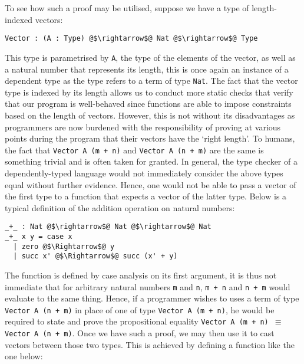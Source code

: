 \documentclass[12pt,twoside,maitrise]{dms}
\theoremstyle{definition}
\numberwithin{equation}{section}
\numberwithin{table}{chapter}
\numberwithin{figure}{chapter}
\newcommand\fn[1] {\texttt{#1}}
\begin{document}

To see how such a proof may be utilised, suppose we have a type of
length-indexed vectors:

\begin{verbatim}
Vector : (A : Type) @$\rightarrow$@ Nat @$\rightarrow$@ Type
\end{verbatim}

This type is parametrised by \fn{A}, the type of the elements of the vector, as
well as a natural number that represents its length, this is once again an
instance of a dependent type as the type refers to a term of type \fn{Nat}. The
fact that the vector type is indexed by its length allows us to conduct more
static checks that verify that our program is well-behaved since functions are
able to impose constraints based on the length of vectors. However, this is not
without its disadvantages as programmers are now burdened with the
responsibility of proving at various points during the program that their
vectors have the `right length'. To humans, the fact that \fn{Vector A (m + n)}
and \fn{Vector A (n + m)} are the same is something trivial and is often taken
for granted. In general, the type checker of a dependently-typed language would
not immediately consider the above types equal without further evidence. Hence,
one would not be able to pass a vector of the first type to a function that
expects a vector of the latter type. Below is a typical definition of the addition
operation on natural numbers:

\begin{verbatim}
_+_ : Nat @$\rightarrow$@ Nat @$\rightarrow$@ Nat
_+_ x y = case x
  | zero @$\Rightarrow$@ y
  | succ x' @$\Rightarrow$@ succ (x' + y)
\end{verbatim}

The function is defined by case analysis on its first argument, it is thus not
immediate that for arbitrary natural numbers \fn{m} and \fn{n}, \fn{m + n} and
\fn{n + m} would evaluate to the same thing. Hence, if a programmer wishes to
uses a term of type \fn{Vector A (n + m)} in place of one of type \fn{Vector A
  (m + n)}, he would be required to state and prove the propositional equality
\fn{Vector A (m + n) $\equiv$ Vector A (n + m)}. Once we have such a proof, we
may then use it to cast vectors between those two types. This is achieved by
defining a function like the one below:
\end{document}
